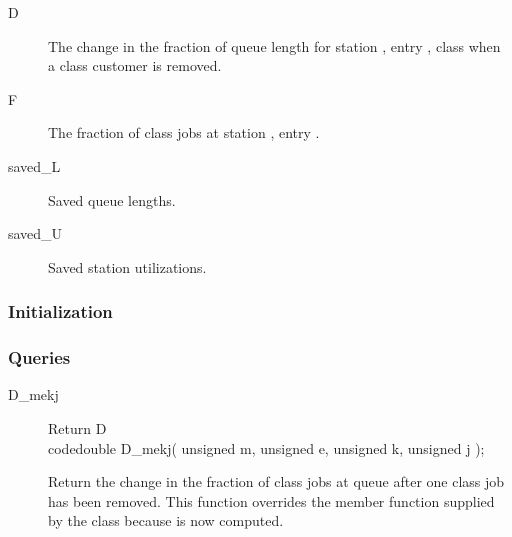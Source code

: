 \begin{description}
\item[D] \texonly{---} The change in the fraction of queue length for
  station , entry , class  when a class 
  customer is removed.
\item[F] \texonly{---} The fraction of class  jobs at station
  , entry . 
\item[saved\_L] \texonly{---} Saved queue lengths.
\item[saved\_U] \texonly{---} Saved station utilizations.
\end{description}

\subsubsection{Initialization}

\subsubsection{Queries}

\begin{description}

\item[D\_mekj] \texonly{---} Return D\\
code{double D\_mekj( unsigned m, unsigned e, unsigned k, unsigned j );}

Return the change in the fraction of class  jobs at queue
 after one class  job has been removed.  This function
overrides the member function supplied by the  class because
 is now computed.

\end{description}
        
